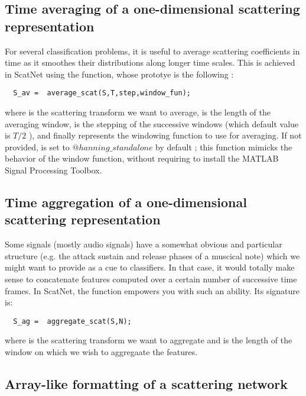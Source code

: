 \documentclass{article}
\begin{document}
\subsection{Time averaging of a one-dimensional scattering representation}

For several classification problems, it is useful to average scattering coefficients in time as it smoothes their distributions along longer time scales. This is achieved in ScatNet using the  function, whose prototye is the following :

\begin{lstlisting}
  S_av =  average_scat(S,T,step,window_fun);
\end{lstlisting}

where  is the scattering transform we want to average,  is the length of the averaging window,  is the stepping of the successive 
windows (which default value is $T/2$ ), and finally  represents the windowing function to use for averaging. If not provided,  is set to  $@hanning\_standalone$ by default ; this function mimicks the behavior of the  window function, without requiring to install the MATLAB Signal Processing Toolbox. 

\subsection{Time aggregation of a one-dimensional scattering representation}

Some signals (mostly audio signals) have a somewhat obvious and particular structure (e.g. the attack sustain and release phases of a muscical note) which we might want 
to provide as a cue to classifiers. In that case, it would totally make sense to concatenate features computed over a certain number of successive time frames. In ScatNet,
the function  empowers you with such an ability. Its  signature is:

\begin{lstlisting}
  S_ag =  aggregate_scat(S,N);
\end{lstlisting}
where  is the scattering transform we want to aggregate and  is the length of the window on which we wish to aggregaate the features.

\subsection{Array-like formatting of a scattering network}
\end{document}
